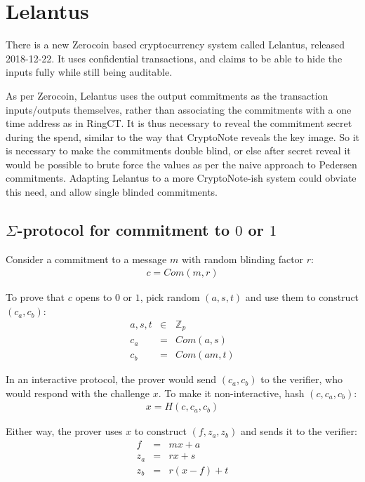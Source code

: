 \documentclass{article}
\begin{document}
\section{Lelantus}

There is a new Zerocoin based cryptocurrency system called Lelantus, released 2018-12-22.  It uses confidential transactions, and claims to be able to hide the inputs fully while still being auditable.  

As per Zerocoin, Lelantus uses the output commitments as the transaction inputs/outputs themselves, rather than associating the commitments with a one time address as in RingCT.  It is thus necessary to reveal the commitment secret during the spend, similar to the way that CryptoNote reveals the key image.  So it is necessary to make the commitments double blind, or else after secret reveal it would be possible to brute force the values as per the naive approach to Pedersen commitments.  Adapting Lelantus to a more CryptoNote-ish system could obviate this need, and allow single blinded commitments.


\subsection{$\Sigma$-protocol for commitment to $0$ or $1$}

Consider a commitment to a message $m$ with random blinding factor $r$:
\begin{eqnarray}
  c=Com(m, r)
\end{eqnarray}

To prove that $c$ opens to $0$ or $1$, pick random $(a,s,t)$ and use them to construct $(c_a, c_b)$:
\begin{eqnarray}
  a,s,t &\in& \mathbb{Z}_p\\
  c_a &=& Com(a, s)\\
  c_b &=& Com(am, t)
\end{eqnarray}

In an interactive protocol, the prover would send $(c_a,c_b)$ to the verifier, who would respond with the challenge $x$.  To make it non-interactive, hash $(c, c_a, c_b)$:
\begin{eqnarray}
  x = H(c, c_a, c_b)
\end{eqnarray}

Either way, the prover uses $x$ to construct $(f, z_a, z_b)$ and sends it to the verifier:
\begin{eqnarray}
  f &=& mx + a\\
  z_a &=& rx + s\\
  z_b &=& r(x-f) + t
\end{eqnarray}
\end{document}
